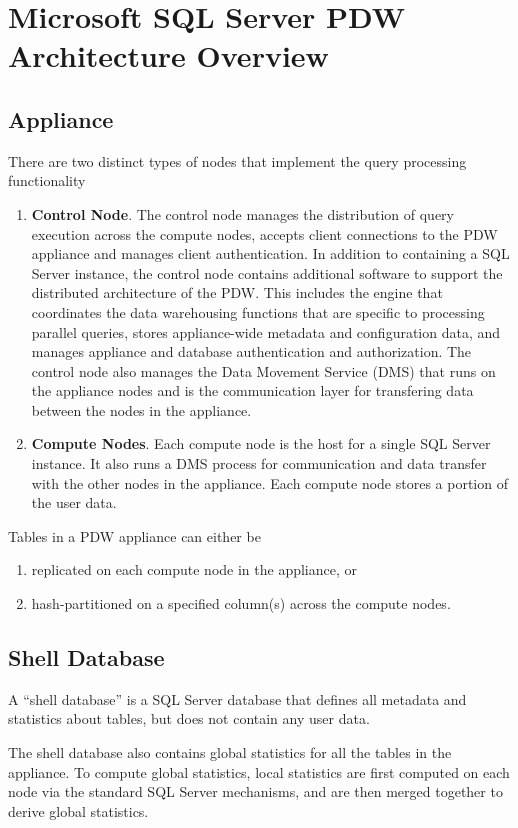 \documentclass[11pt]{article}
\begin{document}
\section{Microsoft SQL Server PDW Architecture Overview}
\label{sec:org1bb8648}
\subsection{Appliance}
\label{sec:org3f73d37}
There are two distinct types of nodes that implement the query processing functionality
\begin{enumerate}
\item \textbf{Control Node}. The control node manages the distribution of query execution across the compute
nodes, accepts client connections to the PDW appliance and manages client authentication. In
addition to containing a SQL Server instance, the control node contains additional software to
support the distributed architecture of the PDW. This includes the engine that coordinates the data
warehousing functions that are specific to processing parallel queries, stores appliance-wide
metadata and configuration data, and manages appliance and database authentication and
authorization. The control node also manages the Data Movement Service (DMS) that runs on the
appliance nodes and is the communication layer for transfering data between the nodes in the
appliance.
\item \textbf{Compute Nodes}. Each compute node is the host for a single SQL Server instance. It also runs a DMS
process for communication and data transfer with the other nodes in the appliance. Each compute
node stores a portion of the user data.
\end{enumerate}

Tables in a PDW appliance can either be
\begin{enumerate}
\item replicated on each compute node in the appliance, or
\item hash-partitioned on a specified column(s) across the compute nodes.
\end{enumerate}
\subsection{Shell Database}
\label{sec:org4721b79}
A “shell database” is a SQL Server database that defines all metadata and statistics about tables, but
does not contain any user data.

The shell database also contains global statistics for all the tables in the appliance. To compute
global statistics, local statistics are first computed on each node via the standard SQL Server
mechanisms, and are then merged together to derive global statistics.
\end{document}
